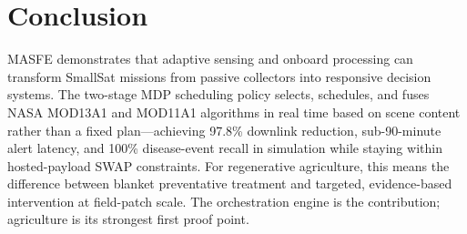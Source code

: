 \section{Conclusion}

\label{chapter:conclusion}

MASFE demonstrates that adaptive sensing and onboard processing can transform SmallSat missions from passive collectors into responsive decision systems. The two-stage MDP scheduling policy selects, schedules, and fuses NASA MOD13A1 and MOD11A1 algorithms in real time based on scene content rather than a fixed plan---achieving 97.8\% downlink reduction, sub-90-minute alert latency, and 100\% disease-event recall in simulation while staying within hosted-payload SWAP constraints. For regenerative agriculture, this means the difference between blanket preventative treatment and targeted, evidence-based intervention at field-patch scale. The orchestration engine is the contribution; agriculture is its strongest first proof point.

